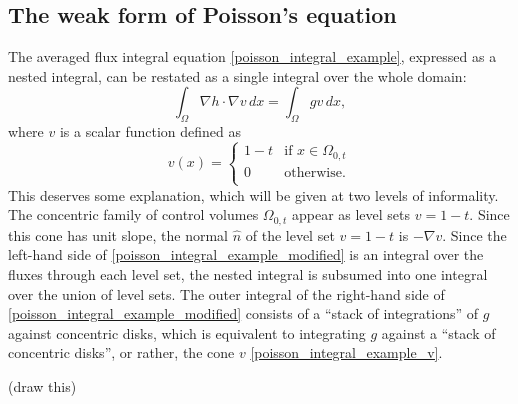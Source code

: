 \subsection{The weak form of Poisson's equation}
The averaged flux integral equation \eqref{poisson_integral_example}, expressed as a nested integral, can be restated as a single integral over
the whole domain:
\begin{equation}\label{poisson_integral_example_modified}
    \int_{\Omega}\nabla h\cdot \nabla v\,dx = \int_{\Omega}gv\,dx,
\end{equation}
where $v$ is a scalar function defined as
\begin{equation}\label{poisson_integral_example_v}
    v(x) = 
    \left\{\begin{array}{lr}
        1 - t &\text{if $x \in \Omega_{0,t}$}\\
        0 &\text{otherwise}.\\
        \end{array}\right.
\end{equation}
This deserves some explanation, which will be given at two levels of informality.
The concentric family of control volumes $\Omega_{0,t}$ appear as level sets $v = 1-t$.
Since this cone has unit slope, the normal $\hat{n}$ of the level set $v = 1-t$ is $-\nabla v$. Since the left-hand side of
\eqref{poisson_integral_example_modified} is an integral over the fluxes through each level set, the nested integral is subsumed into
one integral over the union of level sets.
The outer integral of the right-hand side of \eqref{poisson_integral_example_modified} consists of a ``stack of integrations'' of $g$ against concentric disks, which 
is equivalent to integrating $g$ against a ``stack of concentric disks'', or rather, the cone $v$ \eqref{poisson_integral_example_v}.

\vskip 0.2in
(draw this)
\vskip 0.2in

